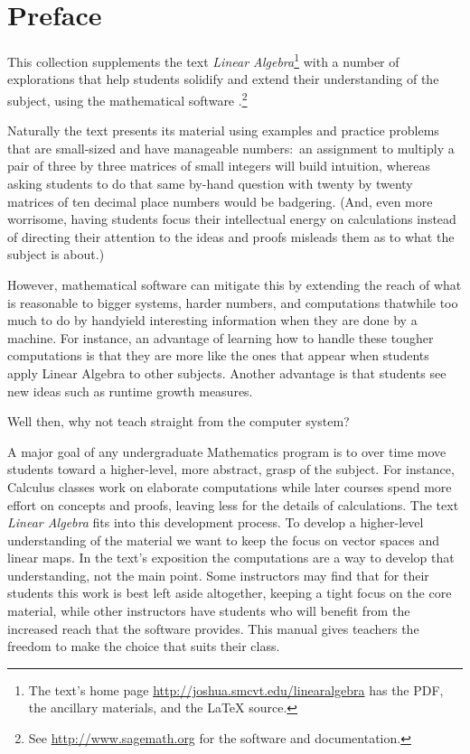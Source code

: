 \chapter*{Preface}\pagestyle{preface}\thispagestyle{preface}


This collection supplements the text \nocite{Hefferon12}
\textit{Linear Algebra}\footnote{The text's home page 
\protect\url{http://joshua.smcvt.edu/linearalgebra} 
has the PDF, the ancillary materials, and the \protect\LaTeX{} source.}
with a number of explorations that help students
solidify and extend their understanding of the subject, 
using the mathematical software \Sage{}.\footnote{See 
\url{http://www.sagemath.org} for the software and documentation.}

Naturally the text presents its material 
using examples and practice problems
that are small-sized and have manageable numbers:~an 
assignment to multiply a pair of three by three matrices
of small integers will build intuition, whereas asking students to do that same 
by-hand question with twenty by twenty matrices
of ten decimal place numbers would be badgering. 
(And, even more worrisome, having students  
focus their intellectual energy on calculations instead of directing
their attention to the ideas and proofs misleads them as to
what the subject is about.)

However, mathematical software can mitigate this by extending the reach of
what is reasonable
to bigger systems, harder numbers, and computations 
that\Dash while too much to do by hand\Dash yield
interesting information when they are done by a machine.
For instance, an advantage of learning how to handle these 
tougher computations is that 
they are more like the ones that appear when students apply Linear 
Algebra to other subjects.
Another advantage is that students see new ideas such as 
runtime growth measures.

Well then, why 
not teach straight from the computer system?

A major goal of any undergraduate Mathematics program is to
over time move students 
toward a higher-level, more abstract, grasp of the subject.
For instance, Calculus classes work on elaborate computations
while later courses spend more effort on concepts and proofs, leaving 
less for the details of calculations.  
The text \textit{Linear Algebra} fits into
this development process.
To develop a higher-level understanding of the material we want to  
keep the focus on vector spaces and linear maps.
In the text's exposition 
the computations are a way to develop that understanding, not the main point.
Some instructors may find 
that for their students
this work is best left aside altogether, keeping a tight focus on the
core material, while other instructors
have students who will benefit from the increased reach that the software
provides.
This manual gives teachers the freedom
to make the choice that suits their class.


